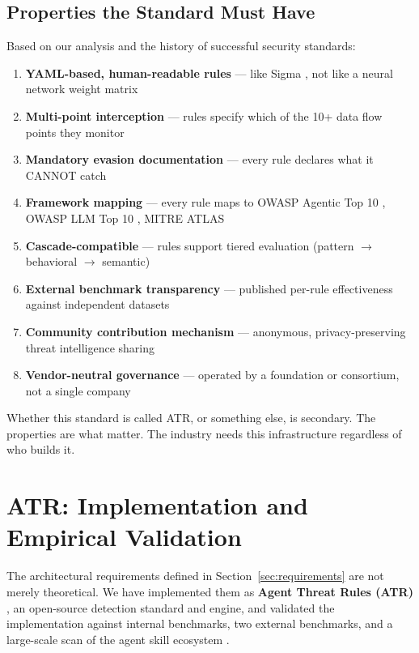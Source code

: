 \documentclass[11pt,letterpaper]{article}
\begin{document}
\subsection{Properties the Standard Must Have}

Based on our analysis and the history of successful security standards:

\begin{enumerate}
\item \textbf{YAML-based, human-readable rules} --- like Sigma \cite{sigma}, not like a neural network weight matrix
\item \textbf{Multi-point interception} --- rules specify which of the 10+ data flow points they monitor
\item \textbf{Mandatory evasion documentation} --- every rule declares what it CANNOT catch
\item \textbf{Framework mapping} --- every rule maps to OWASP Agentic Top 10 \cite{owaspagentic}, OWASP LLM Top 10 \cite{owaspllm}, MITRE ATLAS \cite{mitreatlas}
\item \textbf{Cascade-compatible} --- rules support tiered evaluation (pattern $\rightarrow$ behavioral $\rightarrow$ semantic)
\item \textbf{External benchmark transparency} --- published per-rule effectiveness against independent datasets \cite{pint}
\item \textbf{Community contribution mechanism} --- anonymous, privacy-preserving threat intelligence sharing
\item \textbf{Vendor-neutral governance} --- operated by a foundation or consortium, not a single company
\end{enumerate}

Whether this standard is called ATR, or something else, is secondary. The properties are what matter. The industry needs this infrastructure regardless of who builds it.


\section{ATR: Implementation and Empirical Validation}
\label{sec:atr}

The architectural requirements defined in Section~\ref{sec:requirements} are not merely theoretical. We have implemented them as \textbf{Agent Threat Rules (ATR)} \cite{atr}, an open-source detection standard and engine, and validated the implementation against internal benchmarks, two external benchmarks, and a large-scale scan of the agent skill ecosystem \cite{atrscanmega}.
\end{document}
